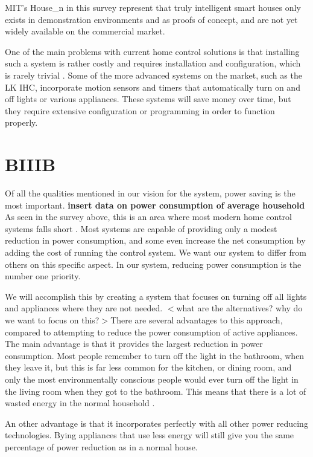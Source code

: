 MIT's House\_n in this survey represent that truly intelligent smart houses only exists in demonstration environments and as proofs of concept, and are not yet widely available on the commercial market.


One of the main problems with current home control solutions is that installing such a system is rather costly and requires installation and configuration, which is rarely trivial . Some of the more advanced systems on the market, such as the LK IHC, incorporate motion sensors and timers that automatically turn on and off lights or various appliances. These systems will save money over time, but they require extensive configuration or programming in order to function properly.

\section{BIIIB}
\label{biiib}

Of all the qualities mentioned in our vision for the system, power saving is the most important. \textbf{insert data on power consumption of average household} As seen in the survey above, this is an area where most modern home control systems falls short . Most systems are capable of providing only a modest reduction in power consumption, and some even increase the net consumption by adding the cost of running the control system. We want our system to differ from others on this specific aspect. In our system, reducing power consumption is the number one priority.

We will accomplish this by creating a system that focuses on turning off all lights and appliances where they are not needed. $<$what are the alternatives? why do we want to focus on this?$>$There are several advantages to this approach, compared to attempting to reduce the power consumption of active appliances. The main advantage is that it provides the largest reduction in power consumption. Most people remember to turn off the light in the bathroom, when they leave it, but this is far less common for the kitchen, or dining room, and only the most environmentally conscious people would ever turn off the light in the living room when they got to the bathroom. This means that there is a lot of wasted energy in the normal household . 

An other advantage is that it incorporates perfectly with all other power reducing technologies. Bying appliances that use less energy will still give you the same percentage of power reduction as in a normal house. 

